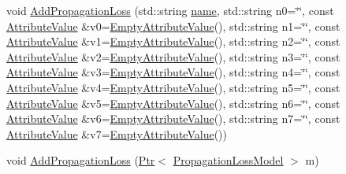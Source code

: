 \begin{DoxyCompactItemize}
void \hyperlink{classns3_1_1SpectrumChannelHelper_ab23845170770bda5be7ee8a2b42c452b}{Add\+Propagation\+Loss} (std\+::string \hyperlink{generate__test__data__lte__spectrum__model_8m_ab74e6bf80237ddc4109968cedc58c151}{name}, std\+::string n0=\char`\"{}\char`\"{}, const \hyperlink{classns3_1_1AttributeValue}{Attribute\+Value} \&v0=\hyperlink{classns3_1_1EmptyAttributeValue}{Empty\+Attribute\+Value}(), std\+::string n1=\char`\"{}\char`\"{}, const \hyperlink{classns3_1_1AttributeValue}{Attribute\+Value} \&v1=\hyperlink{classns3_1_1EmptyAttributeValue}{Empty\+Attribute\+Value}(), std\+::string n2=\char`\"{}\char`\"{}, const \hyperlink{classns3_1_1AttributeValue}{Attribute\+Value} \&v2=\hyperlink{classns3_1_1EmptyAttributeValue}{Empty\+Attribute\+Value}(), std\+::string n3=\char`\"{}\char`\"{}, const \hyperlink{classns3_1_1AttributeValue}{Attribute\+Value} \&v3=\hyperlink{classns3_1_1EmptyAttributeValue}{Empty\+Attribute\+Value}(), std\+::string n4=\char`\"{}\char`\"{}, const \hyperlink{classns3_1_1AttributeValue}{Attribute\+Value} \&v4=\hyperlink{classns3_1_1EmptyAttributeValue}{Empty\+Attribute\+Value}(), std\+::string n5=\char`\"{}\char`\"{}, const \hyperlink{classns3_1_1AttributeValue}{Attribute\+Value} \&v5=\hyperlink{classns3_1_1EmptyAttributeValue}{Empty\+Attribute\+Value}(), std\+::string n6=\char`\"{}\char`\"{}, const \hyperlink{classns3_1_1AttributeValue}{Attribute\+Value} \&v6=\hyperlink{classns3_1_1EmptyAttributeValue}{Empty\+Attribute\+Value}(), std\+::string n7=\char`\"{}\char`\"{}, const \hyperlink{classns3_1_1AttributeValue}{Attribute\+Value} \&v7=\hyperlink{classns3_1_1EmptyAttributeValue}{Empty\+Attribute\+Value}())
\item 
void \hyperlink{classns3_1_1SpectrumChannelHelper_af9d3bce88cb4affb49c8c2839a05388a}{Add\+Propagation\+Loss} (\hyperlink{classns3_1_1Ptr}{Ptr}$<$ \hyperlink{classns3_1_1PropagationLossModel}{Propagation\+Loss\+Model} $>$ m)
\item 

\end{DoxyCompactItemize}
